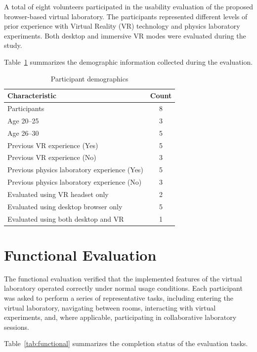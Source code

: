 A total of eight volunteers participated in the usability evaluation of the proposed browser-based virtual laboratory. The participants represented different levels of prior experience with Virtual Reality (VR) technology and physics laboratory experiments. Both desktop and immersive VR modes were evaluated during the study.

Table~\ref{tab:participants} summarizes the demographic information collected during the evaluation.

\begin{table}[H]
\centering
\caption{Participant demographics}
\label{tab:participants}
\renewcommand{\arraystretch}{1.3}
\begin{tabular}{lc}
\hline
\textbf{Characteristic} & \textbf{Count} \\
\hline
Participants & 8 \\
Age 20--25 & 3 \\
Age 26--30 & 5 \\
Previous VR experience (Yes) & 5 \\
Previous VR experience (No) & 3 \\
Previous physics laboratory experience (Yes) & 5 \\
Previous physics laboratory experience (No) & 3 \\
Evaluated using VR headset only & 2 \\
Evaluated using desktop browser only & 5 \\
Evaluated using both desktop and VR & 1 \\
\hline
\end{tabular}
\end{table}

\section{Functional Evaluation}

The functional evaluation verified that the implemented features of the virtual laboratory operated correctly under normal usage conditions. Each participant was asked to perform a series of representative tasks, including entering the virtual laboratory, navigating between rooms, interacting with virtual experiments, and, where applicable, participating in collaborative laboratory sessions.

Table~\ref{tab:functional} summarizes the completion status of the evaluation tasks.

